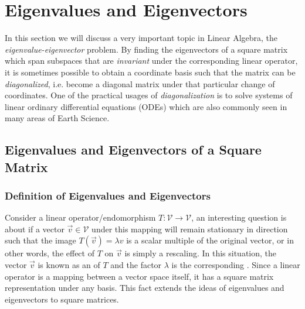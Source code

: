 \chapter{Eigenvalues and Eigenvectors}

In this section we will discuss a very important topic in Linear Algebra, the \textit{eigenvalue-eigenvector} problem. By finding the eigenvectors of a square matrix which span subspaces that are \textit{invariant} under the corresponding linear operator, it is sometimes possible to obtain a coordinate basis such that the matrix can be \textit{diagonalized}, i.e. become a diagonal matrix under that particular change of coordinates. One of the practical usages of \textit{diagonalization} is to solve systems of linear ordinary differential equations (ODEs) which are also commonly seen in many areas of Earth Science.

\section{Eigenvalues and Eigenvectors of a Square Matrix}
\label{section:eigensection}

\subsection{Definition of Eigenvalues and Eigenvectors}

Consider a linear operator/endomorphism $T: \mathcal{V} \to \mathcal{V}$, an interesting question is about if a vector $\vec{v} \in \mathcal{V}$ under this mapping will remain stationary in direction such that the image $T(\vec{v}) = \lambda v$ is a scalar multiple of the original vector, or in other words, the effect of $T$ on $\vec{v}$ is simply a rescaling. In this situation, the vector $\vec{v}$ is known as an  of $T$ and the factor $\lambda$ is the corresponding . Since a linear operator is a mapping between a vector space itself, it has a square matrix representation under any basis. This fact extends the ideas of eigenvalues and eigenvectors to square matrices.


